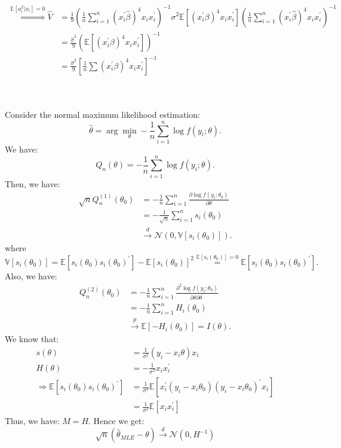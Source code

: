 \begin{eg}
\begin{align*}
        \overset{\mathbb{E}[u_i^2|x_i]=0}{\Longrightarrow} \hat{V} &= \frac{1}{9}\left(\frac{1}{n} \sum_{i=1}^{n} (x_i^{\prime} \hat{\beta})^4 x_i x_i^{\prime} \right)^{-1} \sigma^2\mathbb{E}\left[(x_i^{\prime} \beta)^4 x_i x_i^{\prime} \right] \left(\frac{1}{n} \sum_{i=1}^{n} (x_i^{\prime} \hat{\beta})^4 x_i x_i^{\prime} \right)^{-1} \\
        &= \frac{\hat{\sigma}^2}{9} \left(\mathbb{E}\left[(x_i^{\prime} \beta)^4 x_i x_i^{\prime} \right]\right)^{-1} \\
        &= \frac{\hat{\sigma}^2}{9} \left[\frac{1}{n} \sum (x_i^{\prime} \beta)^4 x_i x_i^{\prime} \right]^{-1} \\
    \end{align*}
\end{eg}

\begin{eg}
    \

    Consider the normal maximum likelihood estimation:
    \[
    \hat{\theta} = \arg \min_{\theta} -\frac{1}{n}\sum_{i=1}^{n} \log f(y_i; \theta).
    \]
    We have:
    \[
    Q_n(\theta) = -\frac{1}{n} \sum_{i=1}^{n} \log f(y_i; \theta).
    \]
    Then, we have:
    \begin{align*}
        \sqrt{n} Q_n^{(1)}(\theta_0) &= -\frac{1}{n} \sum_{i=1}^{n} \frac{\partial \log f(y_i; \theta_0)}{\partial \theta} \\
        &= -\frac{1}{\sqrt{n}} \sum_{i=1}^{n} s_i(\theta_0) \\ 
        &\overset{d}{\rightarrow} \mathcal{N}(0, \mathbb{V}[s_i(\theta_0)]).
    \end{align*}
    where
    \[
    \mathbb{V}[s_i(\theta_0)] = \mathbb{E}[s_i(\theta_0)s_i(\theta_0)^{\prime}] - \mathbb{E}[s_i(\theta_0)]^2 \stackrel{\mathbb{E}[s_i(\theta_0)] = 0}{=} \mathbb{E}[s_i(\theta_0)s_i(\theta_0)^{\prime}].
    \]
    Also, we have:
    \begin{align*}
        Q_n^{(2)}(\theta_0) &= -\frac{1}{n} \sum_{i=1}^{n} \frac{\partial^2 \log f(y_i; \theta_0)}{\partial \theta \partial \theta^{\prime}} \\
        &= -\frac{1}{n} \sum_{i=1}^{n} H_i(\theta_0) \\
        &\overset{p}{\rightarrow} \mathbb{E}[-H_i(\theta_0)] = I(\theta).
    \end{align*}
    We know that:
    \begin{align*}
        s(\theta) &= \frac{1}{\sigma ^2} (y_i - x_i \theta)x_i \\
        H(\theta) &= -\frac{1}{\sigma^2} x_i x_i^{\prime} \\
        \Rightarrow \mathbb{E}[s_i(\theta_0)s_i(\theta_0)^{\prime}] &= \frac{1}{\sigma^4} \mathbb{E}[x_i^{\prime} (y_i - x_i \theta_0)(y_i - x_i \theta_0)^{\prime} x_i] \\
        &= \frac{1}{\sigma^2} \mathbb{E}[x_i x_i^{\prime}]
    \end{align*}
    Thus, we have: $M = H$.
    Hence we get:
    \[\sqrt{n}(\hat{\theta}_{MLE} - \theta) \overset{d}{\rightarrow} \mathcal{N}(0, H^{-1})\]
\end{eg}